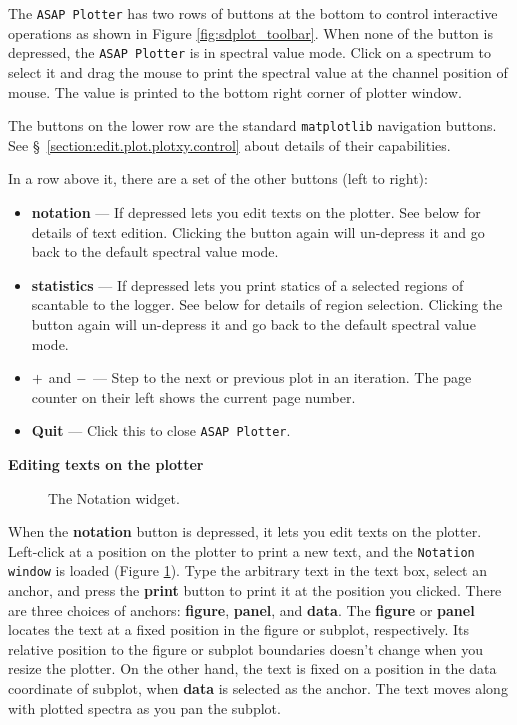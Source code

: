 The {\tt ASAP Plotter} has two rows of buttons at the bottom to 
control interactive operations as shown in Figure \ref{fig:sdplot_toolbar}. 
When none of the button is depressed, the {\tt ASAP Plotter} is in spectral 
value mode. Click on a spectrum to select it and drag the mouse to print 
the spectral value at the channel position of mouse. The value is printed 
to the bottom right corner of plotter window.

The buttons on the lower row are the standard 
{\tt matplotlib} navigation buttons. 
See \S~\ref{section:edit.plot.plotxy.control} about details of their 
capabilities.

In a row above it, there are a set of the other buttons (left to right):
\begin{itemize}
\item {\bf notation} --- If depressed lets you edit texts on the plotter. 
  See below for details of text edition.
  Clicking the button again will un-depress it and go back 
  to the default spectral value mode.
\item {\bf statistics} --- If depressed lets you print statics of a 
  selected regions of scantable to the logger.
  See below for details of region selection.
  Clicking the button again will un-depress it and go back 
  to the default spectral value mode.
\item $ {\bf +} $ and $ {\bf -} $ --- Step to the next or previous plot 
  in an iteration. The page counter on their left shows the current page
  number.
\item {\bf Quit} --- Click this to close {\tt ASAP Plotter}.
\end {itemize}

{\bf Editing texts on the plotter}\\
\begin{figure}[h!]
\begin{center}
\caption{\label{fig:notationwin} The Notation widget.}
\hrulefill
\end{center}
\end{figure}

When the {\bf notation} button is depressed, 
it lets you edit texts on the plotter. 
Left-click at a position on the plotter to print a new text,
and the {\tt Notation window} is loaded (Figure \ref{fig:notationwin}).
Type the arbitrary text in the text box, select an anchor, and press 
the {\bf print} button to print it at the position you clicked.
There are three choices of anchors: {\bf figure}, 
{\bf panel}, and {\bf data}. 
The {\bf figure} or {\bf panel} locates the text at a fixed position 
in the figure or subplot, respectively. Its relative position to 
the figure or subplot boundaries doesn't change when you resize the plotter.
On the other hand, the text is fixed on a position in the data coordinate 
of subplot, when {\bf data} is selected as the anchor. 
The text moves along with plotted spectra as you pan the subplot.

